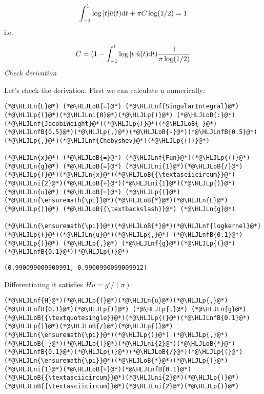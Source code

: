 \documentclass[12pt,landscape]{article}
\newcommand{\HLJLn}[1]{#1}
\newcommand{\HLJLnf}[1]{\textcolor[RGB]{66,102,213}{#1}}
\newcommand{\HLJLnfB}[1]{\textcolor[RGB]{59,151,46}{#1}}
\newcommand{\HLJLni}[1]{\textcolor[RGB]{59,151,46}{#1}}
\newcommand{\HLJLoB}[1]{\textcolor[RGB]{102,102,102}{\textbf{#1}}}
\newcommand{\HLJLp}[1]{#1}
\def\D{ {\rm d} }
\def\dt{\D t}
\begin{document}
{\[
\int_{-1}^1 \log|t| \tilde u(t) \dt + \pi C \log(1/2)  = 1
\]
i.e.

\[
C = (1 - \int_{-1}^1 \log|t| \tilde u(t) \dt)  {1 \over  \pi \log(1/2)}
\]
\emph{Check derivation}

Let's check the derivation. First we can calculate $u$ numerically:


\begin{lstlisting}
(*@\HLJLn{L}@*) (*@\HLJLoB{=}@*) (*@\HLJLnf{SingularIntegral}@*)(*@\HLJLp{(}@*)(*@\HLJLni{0}@*)(*@\HLJLp{)}@*) (*@\HLJLoB{:}@*) (*@\HLJLnf{JacobiWeight}@*)(*@\HLJLp{(}@*)(*@\HLJLoB{-}@*)(*@\HLJLnfB{0.5}@*)(*@\HLJLp{,}@*)(*@\HLJLoB{-}@*)(*@\HLJLnfB{0.5}@*)(*@\HLJLp{,}@*)(*@\HLJLnf{Chebyshev}@*)(*@\HLJLp{())}@*)

(*@\HLJLn{x}@*) (*@\HLJLoB{=}@*) (*@\HLJLnf{Fun}@*)(*@\HLJLp{()}@*)
(*@\HLJLn{g}@*) (*@\HLJLoB{=}@*) (*@\HLJLni{1}@*)(*@\HLJLoB{/}@*)(*@\HLJLp{(}@*)(*@\HLJLn{x}@*)(*@\HLJLoB{{\textasciicircum}}@*)(*@\HLJLni{2}@*)(*@\HLJLoB{+}@*)(*@\HLJLni{1}@*)(*@\HLJLp{)}@*)
(*@\HLJLn{u}@*) (*@\HLJLoB{=}@*) (*@\HLJLp{(}@*)(*@\HLJLn{\ensuremath{\pi}}@*)(*@\HLJLoB{*}@*)(*@\HLJLn{L}@*)(*@\HLJLp{)}@*) (*@\HLJLoB{{\textbackslash}}@*) (*@\HLJLn{g}@*)

(*@\HLJLn{\ensuremath{\pi}}@*)(*@\HLJLoB{*}@*)(*@\HLJLnf{logkernel}@*)(*@\HLJLp{(}@*)(*@\HLJLn{u}@*)(*@\HLJLp{,}@*) (*@\HLJLnfB{0.1}@*)(*@\HLJLp{)}@*) (*@\HLJLp{,}@*) (*@\HLJLnf{g}@*)(*@\HLJLp{(}@*)(*@\HLJLnfB{0.1}@*)(*@\HLJLp{)}@*)
\end{lstlisting}

\begin{lstlisting}
(0.990099009900991, 0.9900990099009912)
\end{lstlisting}


Differentiating it satisfies $H u = g'/(\pi)$:


\begin{lstlisting}
(*@\HLJLnf{H}@*)(*@\HLJLp{(}@*)(*@\HLJLn{u}@*)(*@\HLJLp{,}@*)(*@\HLJLnfB{0.1}@*)(*@\HLJLp{)}@*) (*@\HLJLp{,}@*) (*@\HLJLn{g}@*)(*@\HLJLoB{{\textquotesingle}}@*)(*@\HLJLp{(}@*)(*@\HLJLnfB{0.1}@*)(*@\HLJLp{)}@*)(*@\HLJLoB{/}@*)(*@\HLJLp{(}@*)(*@\HLJLn{\ensuremath{\pi}}@*)(*@\HLJLp{)}@*) (*@\HLJLp{,}@*) (*@\HLJLoB{-}@*)(*@\HLJLp{(}@*)(*@\HLJLni{2}@*)(*@\HLJLoB{*}@*)(*@\HLJLnfB{0.1}@*)(*@\HLJLp{)}@*)(*@\HLJLoB{/}@*)(*@\HLJLp{(}@*)(*@\HLJLn{\ensuremath{\pi}}@*)(*@\HLJLoB{*}@*)(*@\HLJLp{(}@*)(*@\HLJLni{1}@*)(*@\HLJLoB{+}@*)(*@\HLJLnfB{0.1}@*)(*@\HLJLoB{{\textasciicircum}}@*)(*@\HLJLni{2}@*)(*@\HLJLp{)}@*)(*@\HLJLoB{{\textasciicircum}}@*)(*@\HLJLni{2}@*)(*@\HLJLp{)}@*)
\end{lstlisting}

}
\end{document}
